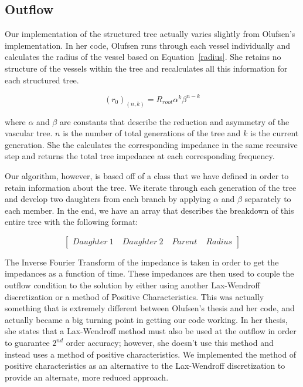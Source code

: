 \documentclass[12pt]{article}
\begin{document}
\subsection{Outflow}
Our implementation of the structured tree actually varies slightly from Olufsen's implementation. In her code, Olufsen runs through each vessel individually and calculates the radius of the vessel based on Equation~\eqref{radius}. She retains no structure of the vessels within the tree and recalculates all this information for each structured tree.

\begin{equation}
	\label{radius}
	(r_0)_(n,k) = R_{root} \alpha^k\beta^{n-k}
\end{equation}

where $\alpha$ and $\beta$ are constants that describe the reduction and asymmetry of the vascular tree. $n$ is the number of total generations of the tree and $k$ is the current generation. She the calculates the corresponding impedance in the same recursive step and returns the total tree impedance at each corresponding frequency. 

Our algorithm, however, is based off of a class that we have defined in order to retain information about the tree. We iterate through each generation of the tree and develop two daughters from each branch by applying $\alpha$ and $\beta$ separately to each member. In the end, we have an array that describes the breakdown of this entire tree with the following format:

\begin{equation}
	\begin{bmatrix}
		Daughter \: 1 \; & Daughter \: 2 \; & Parent \; & Radius 
	\end{bmatrix}
\end{equation}

The Inverse Fourier Transform of the impedance is taken in order to get the impedances as a function of time. These impedances are then used to couple the outflow condition to the solution by either using another Lax-Wendroff discretization or a method of Positive Characteristics. This was actually something that is extremely different between Olufsen's thesis and her code, and actually became a big turning point in getting our code working. In her thesis, she states that a Lax-Wendroff method must also be used at the outflow in order to guarantee $2^{nd}$ order accuracy; however, she doesn't use this method and instead uses a method of positive characteristics. We implemented the method of positive characteristics as an alternative to the Lax-Wendroff discretization to provide an alternate, more reduced approach.
\end{document}
